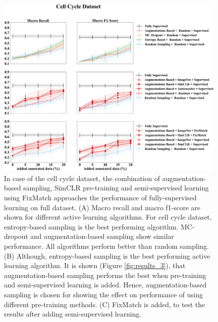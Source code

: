 \begin{figure}[htbp]
\centering
\captionsetup{format=plain}
\includegraphics[width=\textwidth]{figures/fig_2_cycle_recall_f1.png}
\caption{In case of the cell cycle dataset, the combination of augmentation-based sampling, SimCLR pre-training and semi-supervised learning using FixMatch approaches the performance of fully-supervised learning on full dataset. (A) Macro recall and macro f1-score are shown for different active learning algorithms. For cell cycle dataset, entropy-based sampling is the best performing algorithm. MC-dropout and augmentation-based sampling show similar performance. All algorithms perform better than random sampling. (B) Although, entropy-based sampling is the best performing active learning algorithm. It is shown (Figure \ref{fig:results_3}), that augmentation-based sampling performs the best when pre-training and semi-supervised learning is added. Hence, augmentation-based sampling is chosen for showing the effect on performance of using different pre-training methods. (C) FixMatch is added, to test the results after adding semi-supervised learning.}
\label{fig:fig_2_cycle_recall_f1}
\end{figure}

